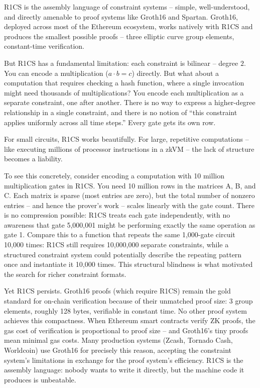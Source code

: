 \documentclass[
  11pt,
  openany]{report}
\begin{document}
R1CS is the assembly language of constraint systems -- simple, well-understood,
and directly amenable to proof systems like Groth16 and Spartan. Groth16,
deployed across most of the Ethereum ecosystem, works natively with R1CS and
produces the smallest possible proofs -- three elliptic curve group elements,
constant-time verification.

But R1CS has a fundamental limitation: each constraint is bilinear -- degree
\(2\). You can encode a multiplication (\(a \cdot b = c\)) directly. But what
about a computation that requires checking a hash function, where a single
invocation might need thousands of multiplications? You encode each
multiplication as a separate constraint, one after another. There is no way to
express a higher-degree relationship in a single constraint, and there is no
notion of ``this constraint applies uniformly across all time steps.'' Every
gate gets its own row.

For small circuits, R1CS works beautifully. For large, repetitive computations
-- like executing millions of processor instructions in a zkVM -- the lack of
structure becomes a liability.

To see this concretely, consider encoding a computation with 10 million
multiplication gates in R1CS. You need 10 million rows in the matrices A, B, and
C. Each matrix is sparse (most entries are zero), but the total number of
nonzero entries -- and hence the prover's work -- scales linearly with the gate
count. There is no compression possible: R1CS treats each gate independently,
with no awareness that gate 5,000,001 might be performing exactly the same
operation as gate 1. Compare this to a function that repeats the same 1,000-gate
circuit 10,000 times: R1CS still requires 10,000,000 separate constraints, while
a structured constraint system could potentially describe the repeating pattern
once and instantiate it 10,000 times. This structural blindness is what
motivated the search for richer constraint formats.

Yet R1CS persists. Groth16 proofs (which require R1CS) remain the gold standard
for on-chain verification because of their unmatched proof size: 3 group
elements, roughly 128 bytes, verifiable in constant time. No other proof system
achieves this compactness. When Ethereum smart contracts verify ZK proofs, the
gas cost of verification is proportional to proof size -- and Groth16's tiny
proofs mean minimal gas costs. Many production systems (Zcash, Tornado Cash,
Worldcoin) use Groth16 for precisely this reason, accepting the constraint
system's limitations in exchange for the proof system's efficiency. R1CS is the
assembly language: nobody wants to write it directly, but the machine code it
produces is unbeatable.
\end{document}
